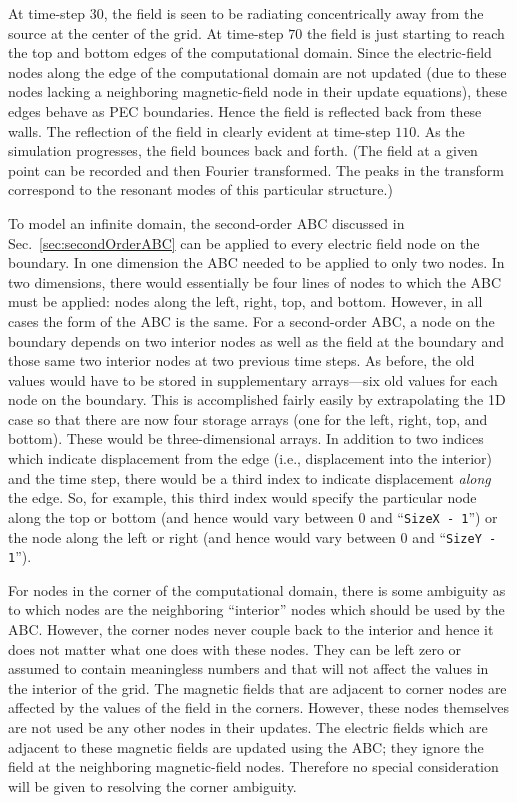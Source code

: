 At time-step $30$, the field is seen to be radiating concentrically
away from the source at the center of the grid.  At time-step $70$ the
field is just starting to reach the top and bottom edges of the
computational domain.  Since the electric-field nodes along the edge
of the computational domain are not updated (due to these nodes
lacking a neighboring magnetic-field node in their update equations),
these edges behave as PEC boundaries.  Hence the field is reflected
back from these walls.  The reflection of the field in clearly
evident at time-step $110$.  As the simulation progresses, the field
bounces back and forth.  (The field at a given point can be recorded
and then Fourier transformed.  The peaks in the transform correspond
to the resonant modes of this particular structure.)

To model an infinite domain, the second-order ABC discussed in Sec.\
\ref{sec:secondOrderABC} can be applied to every electric field node
on the boundary.  In one dimension the ABC needed to be applied to
only two nodes.  In two dimensions, there would essentially be four
lines of nodes to which the ABC must be applied: nodes along the left,
right, top, and bottom.  However, in all cases the form of the ABC is
the same.  For a second-order ABC, a node on the boundary depends on
two interior nodes as well as the field at the boundary and those same
two interior nodes at two previous time steps.  As before, the old
values would have to be stored in supplementary arrays---six old
values for each node on the boundary.  This is accomplished fairly
easily by extrapolating the 1D case so that there are now four storage
arrays (one for the left, right, top, and bottom).  These would be
three-dimensional arrays.  In addition to two indices which indicate
displacement from the edge (i.e., displacement into the interior) and
the time step, there would be a third index to indicate displacement
{\em along} the edge.  So, for example, this third index would specify
the particular node along the top or bottom (and hence would vary
between $0$ and ``{\tt SizeX - 1}'') or the node along the left or right
(and hence would vary between $0$ and ``{\tt SizeY - 1}'').

For nodes in the corner of the computational domain, there is some
ambiguity as to which nodes are the neighboring ``interior'' nodes
which should be used by the ABC.  However, the corner nodes never
couple back to the interior and hence it does not matter what one does
with these nodes.  They can be left zero or assumed to contain
meaningless numbers and that will not affect the values in the
interior of the grid.  The magnetic fields that are adjacent to corner
nodes are affected by the values of the field in the corners.
However, these nodes themselves are not used be any other nodes in
their updates.  The electric fields which are adjacent to these
magnetic fields are updated using the ABC; they ignore the field at
the neighboring magnetic-field nodes.  Therefore no special
consideration will be given to resolving the corner ambiguity.


